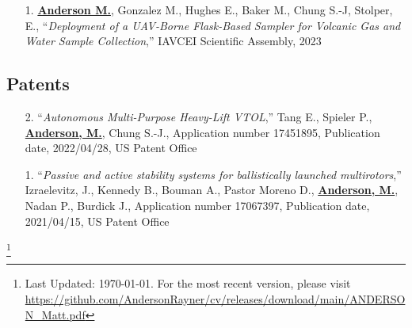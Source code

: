 \documentclass[12pt,letter,sans]{moderncv}        %
\newcommand\blfootnote[1]{%
  \begingroup
  \renewcommand\thefootnote{}\footnote{#1}%
  \addtocounter{footnote}{-1}%
  \endgroup
}
\begin{document}
\begin{itemize}
	\item [1.] \underline{\textbf{Anderson M.}}, Gonzalez M., Hughes E., Baker M., Chung S.-J, Stolper, E., ``\textit{Deployment of a UAV-Borne Flask-Based Sampler for Volcanic Gas and Water Sample Collection},'' IAVCEI Scientific Assembly, 2023
\end{itemize}

\subsection{Patents}

\begin{itemize}
    \item [2.] ``\textit{Autonomous Multi-Purpose Heavy-Lift VTOL},'' Tang E., Spieler P., \underline{\textbf{Anderson, M.}}, Chung S.-J., Application number 17451895, Publication date, 2022/04/28, US Patent Office

    \item [1.] ``\textit{Passive and active stability systems for ballistically launched multirotors},'' Izraelevitz, J., Kennedy B., Bouman A., Pastor Moreno D., \underline{\textbf{Anderson, M.}}, Nadan P., Burdick J., Application number 17067397, Publication date, 2021/04/15, US Patent Office
\end{itemize}



%

\vfill
\enlargethispage{\footskip}
\blfootnote{Last Updated: \today.  For the most recent version, please visit \url{https://github.com/AndersonRayner/cv/releases/download/main/ANDERSON_Matt.pdf}}
\end{document}
